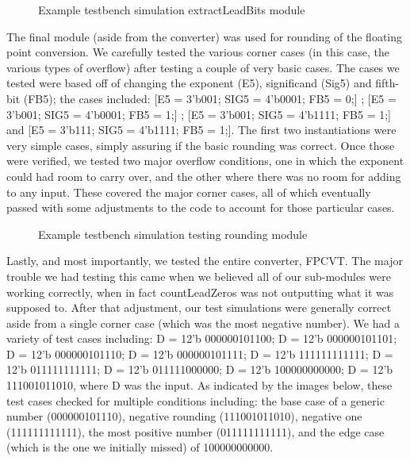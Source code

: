 \documentclass{article}
\begin{document}
\begin{figure}[H]
	\begin{center}
		\caption{Example testbench simulation extractLeadBits module}
	\end{center}
\end{figure}


The final module (aside from the converter) was used for rounding of the floating point conversion.  We carefully tested the various corner cases (in this case, the various types of overflow) after testing a couple of very basic cases.  The cases we tested were based off of changing the exponent (E5), significand (Sig5) and fifth-bit (FB5); the cases included: [E5 = 3'b001; SIG5 = 4'b0001; FB5 = 0;] ; [E5 = 3'b001; SIG5 = 4'b0001; FB5 = 1;] ; [E5 = 3'b001; SIG5 = 4'b1111; FB5 = 1;] and [E5 = 3'b111; SIG5 = 4'b1111; FB5 = 1;].  The first two instantiations were very simple cases, simply assuring if the basic rounding was correct.  Once those were verified, we tested two major overflow conditions, one in which the exponent could had room to carry over, and the other where there was no room for adding to any input.  These covered the major corner cases, all of which eventually passed with some adjustments to the code to account for those particular cases. 

\begin{figure}[H]
	\begin{center}
		\caption{Example testbench simulation testing rounding module}
	\end{center}
\end{figure}

Lastly, and most importantly, we tested the entire converter, FPCVT.  The major trouble we had testing this came when we believed all of our sub-modules were working correctly, when in fact countLeadZeros was not outputting what it was supposed to.  After that adjustment, our test simulations were generally correct aside from a single corner case (which was the most negative number).  We had a variety of test cases including: D = 12'b 000000101100; D = 12'b 000000101101; D = 12'b 000000101110; D = 12'b 000000101111; D = 12'b 111111111111; D = 12'b 011111111111; D = 12'b 011111000000; D = 12'b 100000000000; D = 12'b 111001011010, where D was the input.  As indicated by the images below, these test cases checked for multiple conditions including: the base case of a generic number (000000101110), negative rounding (111001011010), negative one (111111111111), the most positive number (011111111111), and the edge case (which is the one we initially missed) of 100000000000. 
\end{document}

